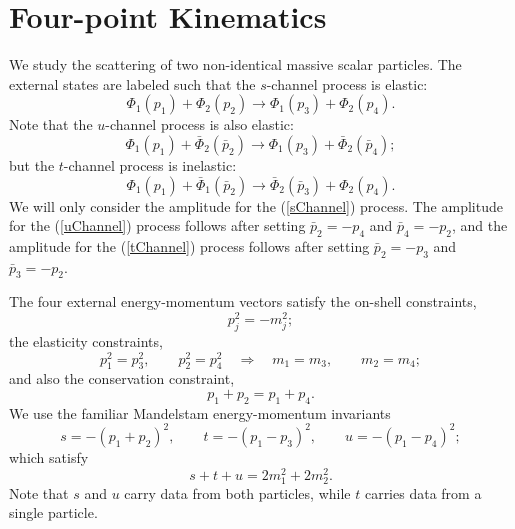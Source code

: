 \section{Four-point Kinematics\label{app1}}
We study the scattering of two non-identical massive scalar particles. The external states are labeled such that the $s$-channel process is elastic:
\begin{equation}
	\Phi_{1}(p_{1}) + \Phi_{2}(p_{2}) \longrightarrow \Phi_{1}(p_{3}) + \Phi_{2}(p_{4}).
	\label{sChannel}
\end{equation}
Note that the $u$-channel process is also elastic:
\begin{equation}
	\Phi_{1}(p_{1}) + \bar{\Phi}_{2}(\bar{p}_{2}) \longrightarrow \Phi_{1}(p_{3}) + \bar{\Phi}_{2}(\bar{p}_{4});
	\label{uChannel}
\end{equation}
but the $t$-channel process is inelastic:
\begin{equation}
	\Phi_{1}(p_{1}) + \bar{\Phi}_{1}(\bar{p}_{2}) \longrightarrow \bar{\Phi}_{2}(\bar{p}_{3}) + \Phi_{2}(p_{4}).
	\label{tChannel}
\end{equation}
We will only consider the amplitude for the (\ref{sChannel}) process. The amplitude for the (\ref{uChannel}) process follows after setting $\bar{p}_{2} = -p_{4}$ and $\bar{p}_{4} = -p_{2}$, and the amplitude for the (\ref{tChannel}) process follows after setting $\bar{p}_{2} = -p_{3}$ and $\bar{p}_{3} = -p_{2}$.

The four external energy-momentum vectors satisfy the on-shell constraints,
\begin{equation}
	p_{j}^{2} = - m_{j}^{2};
\end{equation}
the elasticity constraints,
\begin{equation}
	p_{1}^{2} = p_{3}^{2}, \qquad p_{2}^{2} = p_{4}^{2} \quad \Longrightarrow \quad m_{1} = m_{3}, \qquad m_{2} = m_{4}; \label{elas}
\end{equation}
and also the conservation constraint,
\begin{equation}
	p_{1} + p_{2} = p_{1} + p_{4}.
\end{equation}
We use the familiar Mandelstam energy-momentum invariants
\begin{equation}
	s = -(p_{1} + p_{2})^{2}, \qquad t = -(p_{1} - p_{3})^{2}, \qquad u = -(p_{1} - p_{4})^{2};
\end{equation}
which satisfy
\begin{equation}
	s + t + u = 2 m_{1}^{2} + 2 m_{2}^{2}.
\end{equation}
Note that $s$ and $u$ carry data from both particles, while $t$ carries data from a single particle.

